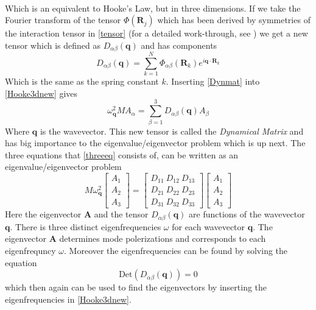 \begin{align}
\end{align}Which is an equivalent to Hooke's Law, but in three dimensions. If we take the Fourier transform of the tensor $\Phi(\mathbf{R}_{j})$ which has been derived by symmetries of the interaction tensor in \cref{tensor} (for a detailed work-through, see ) we get a new tensor which is defined as $D_{\alpha\beta}(\mathbf{q})$ and has components\begin{equation}
    D_{\alpha\beta}(\mathbf{q})=\sum_{k=1}^{N}\Phi_{\alpha\beta}(\mathbf{R}_{k})e^{i\mathbf{q}\cdot\mathbf{R}_{k}}\label{Dynmat}
\end{equation} Which is the same as the spring constant $k$. Inserting \cref{Dynmat} into \cref{Hooke3dnew} gives\begin{equation}
    \omega_{\mathbf{q}}^{2}MA_{\alpha}=\sum_{\beta=1}^{3}D_{\alpha\beta}(\mathbf{q})A_{\beta}\label{threeeq}
\end{equation}Where $\mathbf{q}$ is the wavevector. This new tensor is called the \textit{Dynamical Matrix} and has big importance to the eigenvalue/eigenvector problem which is up next. The three equations that \cref{threeeq} consists of, can be written as an eigenvalue/eigenvector problem\begin{equation}
    M\omega_{\mathbf{q}}^{2}\begin{bmatrix}
           A_{1} \\
           A_{2} \\
           A_{3}
         \end{bmatrix}=\begin{bmatrix}
           D_{11} \ D_{12} \ D_{13}\\
           D_{21} \ D_{22} \ D_{23}\\
           D_{31} \ D_{32} \ D_{33}
         \end{bmatrix}\begin{bmatrix}
           A_{1} \\
           A_{2} \\
           A_{3}
         \end{bmatrix}
\end{equation} Here the eigenvector $\mathbf{A}$ and the tensor $D_{\alpha\beta}(\mathbf{q})$ are functions of the wavevector $\mathbf{q}$. There is three distinct eigenfrequencies $\omega$ for each wavevector $\mathbf{q}$. The eigenvector $\mathbf{A}$ determines mode polerizations and corresponds to each eigenfrequncy $\omega$. Moreover the eigenfrequencies can be found by solving the equation\begin{equation}
    \text{Det}(D_{\alpha\beta}(\mathbf{q}))=0 
\end{equation}which then again can be used to find the eigenvectors by inserting the eigenfrequencies in \cref{Hooke3dnew}. \\
